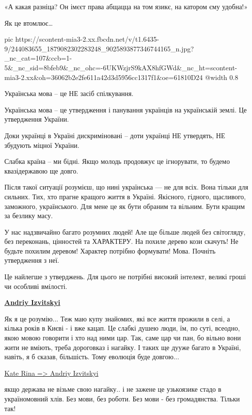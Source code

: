 «А какая разніца? Он імєєт права абщацца на том язикє, на катором єму удобна!» 

Як це втомлює…

\ifcmt
  pic https://scontent-mia3-2.xx.fbcdn.net/v/t1.6435-9/244083655_1879082302283248_9025893877346744165_n.jpg?_nc_cat=107&ccb=1-5&_nc_sid=8bfeb9&_nc_ohc=-6UKWzjrS9kAX8hfGWd&_nc_ht=scontent-mia3-2.xx&oh=36062b2e2fe611a42d3d5956cc1317f1&oe=61810D24
  @width 0.8
\fi

Українська мова – це НЕ засіб спілкування. 

Українська мова – це утвердження і панування українців на українській землі. Це
утвердження України. 

Доки українці в Україні дискриміновані – доти українці НЕ утвердять, НЕ
збудують міцної України. 

Слабка країна – ми бідні. Якщо молодь продовжує це ігнорувати, то будемо
квазідержавою ще довго.

Після такої ситуації розумієш, що нині українська — не для всіх. Вона тільки
для сильних. Тих, хто прагне кращого життя в Україні. Якісного, гідного,
щасливого, заможного, українського. Для мене це як бути обраним та вільним.
Бути кращим за безлику масу.

У нас надзвичайно багато розумних людей! Але ще більше людей без світогляду,
без переконань, цінностей та ХАРАКТЕРУ. На похиле дерево кози скачуть! Не
будьте похилим деревом! Характер потрібно формувати! Мова. Почніть утвердження
з неї. 

Це найлегше з утверджень. Для цього не потрібні високий інтелект, великі гроші
чи особливі вмілості.


\begin{center}
	\begin{fminipage}{0.9\textwidth}
\large\bfseries\color{blue}
\underline{\color{orange} Andriy Izvitskyi}\par
Як я це розумію... Теж маю купу знайомих, які все життя прожили в селі, а
кілька років в Києві - і вже кацап. Це слабкі душею люди, їм, по суті, всеодно,
якою мовою говорити і хто над ними цар. Так, саме цар чи пан, бо вільно вони
жити не вміють, треба дороговказ і нагайку. І таких ще дууже багато в Україні,
навіть, я б сказав, більшість. Тому еволюція буде довгою...

\underline{\color{orange} Kate Rina => Andriy Izvitskyi}\par 
якщо держава не візьме свою нагайку..  і не зажене це узькоязике стадо в
україномовний хлів. Без мови, без роботи. Без мови - без громадянства. Тільки
так!
	\end{fminipage}
\end{center}

